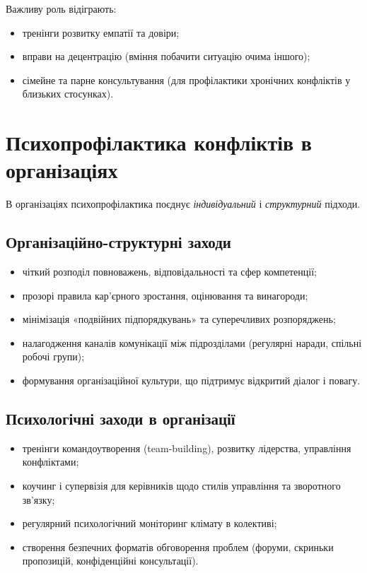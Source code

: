 \documentclass[12pt,a4paper]{article}
\begin{document}
    Важливу роль відіграють:
    \begin{itemize}
        \item тренінги розвитку емпатії та довіри;
        \item вправи на децентрацію (вміння побачити ситуацію очима іншого);
        \item сімейне та парне консультування (для профілактики хронічних конфліктів у близьких стосунках).
    \end{itemize}

    \section*{Психопрофілактика конфліктів в організаціях}
    В організаціях психопрофілактика поєднує \textit{індивідуальний} і \textit{структурний} підходи.

    \subsection*{Організаційно-структурні заходи}
    \begin{itemize}
        \item чіткий розподіл повноважень, відповідальності та сфер компетенції;
        \item прозорі правила кар’єрного зростання, оцінювання та винагороди;
        \item мінімізація «подвійних підпорядкувань» та суперечливих розпоряджень;
        \item налагодження каналів комунікації між підрозділами (регулярні наради, спільні робочі групи);
        \item формування організаційної культури, що підтримує відкритий діалог і повагу.
    \end{itemize}

    \subsection*{Психологічні заходи в організації}
    \begin{itemize}
        \item тренінги командоутворення (team-building), розвитку лідерства, управління конфліктами;
        \item коучинг і супервізія для керівників щодо стилів управління та зворотного зв’язку;
        \item регулярний психологічний моніторинг клімату в колективі;
        \item створення безпечних форматів обговорення проблем (форуми, скриньки пропозицій, конфіденційні консультації).
    \end{itemize}
\end{document}
